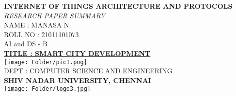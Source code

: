 \begin{titlepage}
    \centering
        \vspace*{0.2cm}
        \Huge
        \textbf{INTERNET OF THINGS ARCHITECTURE AND PROTOCOLS}\\
        \vspace*{0.4cm}
        \Huge
        \textit{RESEARCH PAPER SUMMARY}\\
        \normalsize
        \vspace*{0.5cm}
        NAME : MANASA N\\
        \vspace{0.2cm}
        ROLL NO : 21011101073\\
        \vspace{0.2cm}
        AI and DS - B\\
        \vspace{1.2cm}
        \textbf{\underline {TITLE : SMART CITY DEVELOPMENT}}\\
        \vspace*{0.5cm}
        \texttt{[image: Folder/pic1.png]}\\
        \vspace*{1cm}
        DEPT : COMPUTER SCIENCE AND ENGINEERING\\
        \textbf{SHIV NADAR UNIVERSITY, CHENNAI}\\
        \texttt{[image: Folder/logo3.jpg]}  
\end{titlepage}